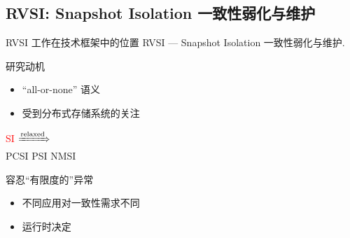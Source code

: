 \subsection{RVSI: Snapshot Isolation 一致性弱化与维护}

\newcommand{\chameleon}{$\textsc{Chameleon}^{\textsc{\scriptsize TKVS}}$}
\newcommand{\konebv}{$k_1$-BV}
\newcommand{\ktwofv}{$k_2$-FV}
\newcommand{\kthreesv}{$k_3$-SV}
\newcommand{\mpord}[1]{\mathcal{O}_{#1}}
\newcommand{\tsts}[1]{#1.{sts}}
\newcommand{\tcts}[1]{#1.{cts}}
\newcommand{\hp}{\prec_{h}}
\begin{frame}{RVSI 工作在技术框架中的位置}
	{RVSI --- Snapshot Isolation 一致性弱化与维护.}
\end{frame}
\begin{frame}{研究动机}
  \vspace{0.15cm}

  \begin{description}
    \setlength{\itemsep}{5pt}
    \item[分布式事务:]
      \begin{itemize}
        \item ``all-or-none'' 语义
		\item 受到分布式存储系统的关注 \href{https://issues.apache.org/jira/browse/CASSANDRA-7056}{}
      \end{itemize}
	\item[弱一致性:] \textcolor{red}{SI}  \textcolor{red}{$\xRightarrow{\text{relaxed}}$}\\
        PCSI  PSI  NMSI  
    \pause
	\vspace{0.30cm}
	\item[\textcolor{red}{异常控制:}] 容忍``有限度的''异常 
	\item[\textcolor{red}{可调节:}] 
      \begin{itemize}
        \item 不同应用对一致性需求不同 
        \item 运行时决定 
      \end{itemize}
  \end{description}
\end{frame}
